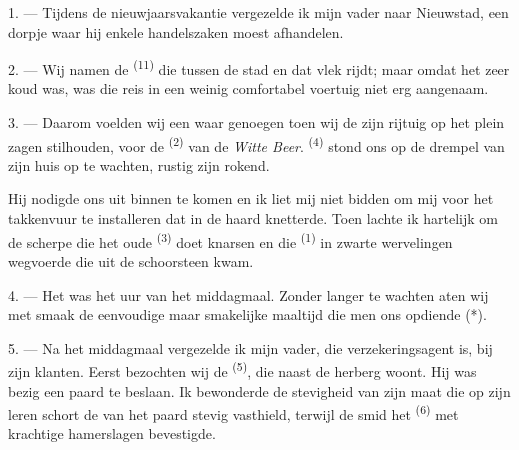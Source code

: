 

\VUsaut{4.0mm}
\VUsaut{3.0mm}
\VUfilet{16mm}
\VUsaut{5.6mm}
\VUsaut{3.0mm}

\VUsaut{3.0mm}

\VUsaut{4.0mm}

1. --- Tijdens de nieuwjaarsvakantie vergezelde ik mijn vader naar Nieuwstad, een dorpje waar
hij enkele handelszaken moest afhandelen.

2. --- Wij namen de  \textsuperscript{(11)} die tussen de stad en dat vlek
rijdt; maar omdat het zeer koud was, was die reis in een weinig comfortabel voertuig niet erg
aangenaam.

3. --- Daarom voelden wij een waar genoegen toen wij de  zijn rijtuig op het
plein zagen stilhouden, voor de  \textsuperscript{(2)} van de \textit{Witte
Beer}.  \textsuperscript{(4)} stond ons op de drempel van zijn huis op
te wachten, rustig zijn  rokend.

Hij nodigde ons uit binnen te komen en ik liet mij niet bidden om mij voor het takkenvuur te
installeren dat in de haard knetterde. Toen lachte ik hartelijk om de scherpe
 die het oude  \textsuperscript{(3)} doet knarsen en
die  \textsuperscript{(1)} in zwarte wervelingen wegvoerde die uit de
schoorsteen kwam.

4. --- Het was het uur van het middagmaal. Zonder langer te wachten aten wij met smaak de
eenvoudige maar smakelijke maaltijd die men ons opdiende (*).

\VUsaut{3.0mm}

5. --- Na het middagmaal vergezelde ik mijn vader, die verzekeringsagent is, bij zijn klanten.
Eerst bezochten wij de  \textsuperscript{(5)}, die naast de herberg woont. Hij
was bezig een paard te beslaan. Ik bewonderde de stevigheid van zijn maat die op zijn leren
schort de  van het paard stevig vasthield, terwijl de smid het 
\textsuperscript{(6)} met krachtige hamerslagen bevestigde.

